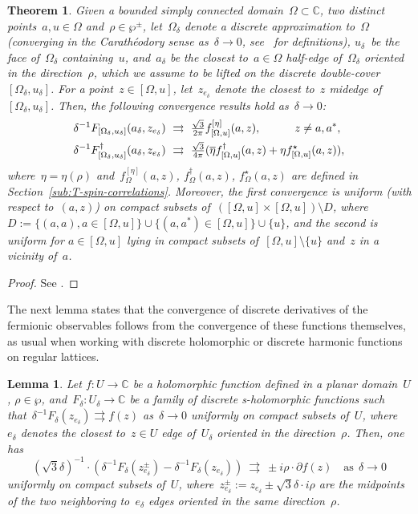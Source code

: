 \documentclass[reqno,11pt,a4paper]{amsart}
\newtheorem{theorem}{Theorem}
\newtheorem{lemma}[proposition]{Lemma}
\theoremstyle{remark}
\newcommand{\C}{\mathbb{C}}
\newcommand{\OmegaU}{{[\Omega,u]}}
\newcommand{\feta}{f_{\Omega}^{[\eta]}}
\newcommand{\fstar}{f_{\Omega}^\star}
\newcommand{\freg}{f_{\Omega}^\dag}
\newcommand{\fetaU}{f_\OmegaU^{[\eta]}}
\newcommand{\fU}{f_\OmegaU}
\newcommand{\fstarU}{f^\star_\OmegaU}
\newcommand{\fregU}{\fU^\dag}
\def\LambdaU{U}
\begin{document}
\begin{theorem}
\label{thm:convergence-spinors}
Given a bounded simply connected domain~$\Omega\subset\C$, two distinct points~$a,u\in\Omega$ and~$\rho\in\wp^\pm$, let~$\Omega_\delta$ denote a discrete approximation to~$\Omega$ (converging in the Carath\'eodory sense as~$\delta\to 0$, see~\cite[Section~3.2]{CheSmi11} for definitions), $u_\delta$~be the face of~$\Omega_\delta$ containing~$u$, and~$a_\delta$ be the closest to~$a\in\Omega$ half-edge of~$\Omega_\delta$ oriented in the direction~$\rho$, which we assume to be lifted on the discrete double-cover~$[\Omega_\delta,u_\delta]$. For a point~$z\in\OmegaU$, let~$z_{e_\delta}$ denote the closest to~$z$ midedge of~$[\Omega_\delta,u_\delta]$. Then, the following convergence results hold as~$\delta\to 0$:
\begin{align}
\label{eq_spinor_convergence}
\delta^{-1}\FdeltaU(a_\delta,z_{e_\delta})&\ \rightrightarrows\ \tfrac{\sqrt{3}}{2\pi}\fetaU(a,z),\quad\qquad z\ne a,a^*, \\
\delta^{-1}\FdeltaU^\dag(a_\delta,z_{e_\delta})&\ \rightrightarrows\ {\tfrac{\sqrt{3}}{4\pi}}({\overline{\eta}}\fregU(a,z)+{\eta}\fstarU(a,z)),
\label{eq_spinor_reg_convergence}
\end{align}
where~$\eta=\eta(\rho)$ and~$\feta(a,z)$, $\freg(a,z)$, $\fstar(a,z)$ are defined in Section~\ref{sub:T-spin-correlations}. Moreover, the first convergence is uniform (with respect to~$(a,z)$)
on compact subsets of~$(\OmegaU\times\OmegaU)\setminus D$, where~$D:=\{(a,a),a\in\OmegaU\}\cup\{(a,a^*)\in\OmegaU\}\cup\{u\}$, and the second is uniform for $a\in\OmegaU$ lying in compact subsets of~$\OmegaU\setminus\{u\}$ and~$z$ in a vicinity of~$a$.
\end{theorem}
\begin{proof}
	See \cite[Theorem~3.16]{CheHonIzy21}.
\end{proof}

The next lemma states that the convergence of discrete derivatives of the fermionic observables follows from the convergence of these functions themselves, as usual when working with discrete holomorphic or discrete harmonic functions on regular lattices.

\begin{lemma}
\label{lemma:conv-derivatives}
Let $f:\LambdaU\to\C$ be a holomorphic function defined in a planar domain~$\LambdaU$, $\rho\in\wp$, and~$F_\delta:\LambdaU_\delta\to \C$ be a family of discrete s-holomorphic functions such that~$\delta^{-1}F_\delta (z_{e_\delta}) \rightrightarrows f(z)$ as~$\delta\to 0$ uniformly on compact subsets of~$\LambdaU$, where~$e_\delta$ denotes the closest to~$z\in\LambdaU$ edge of~$\LambdaU_\delta$ { oriented in the direction~$\rho$}. Then, one has
\[
(\sqrt{3}\delta)^{-1}\cdot (\delta^{-1}F_\delta(z_{e_\delta}^\pm)-\delta^{-1}F_\delta(z_{e_\delta}))~ \rightrightarrows~ \pm i{\rho}\cdot \partial f(z)\quad\text{as}\ \ \delta\to 0
\]
uniformly on compact subsets of~$\LambdaU$, where~$z_{e_\delta}^\pm:=z_{e_\delta}\pm\sqrt{3}\delta\cdot i{\rho}$ are the midpoints of the two neighboring to~$e_\delta$ edges oriented in the same direction~$\rho$.
\end{lemma}
\end{document}
